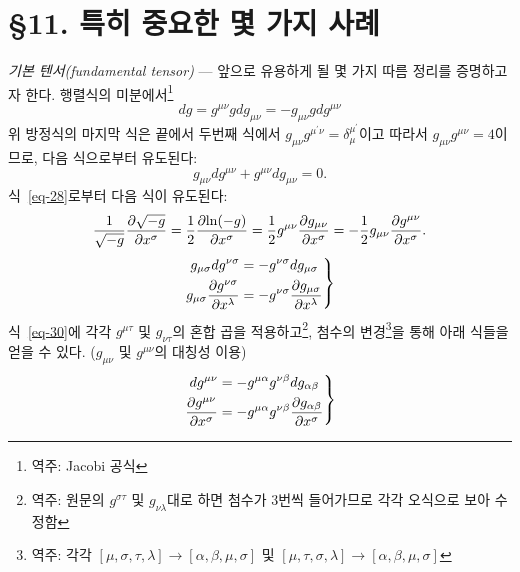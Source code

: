 \documentclass[b5paper]{article}
\begin{document}
\section*{\S 11. 특히 중요한 몇 가지 사례}
\emph{기본 텐서(fundamental tensor)} --- 앞으로 유용하게 될 몇 가지 따름 정리를 증명하고자 한다. 행렬식의 미분에서\footnote{역주: Jacobi 공식}
\begin{equation} \label{eq-28}
	dg = g^{\mu\nu} g dg_{\mu\nu} = -g_{\mu\nu} g dg^{\mu\nu}
\end{equation}
위 방정식의 마지막 식은 끝에서 두번째 식에서 $g_{\mu\nu} g^{\mu^\prime \nu} = \delta_\mu^{\mu^\prime}$이고 따라서 $g_{\mu\nu} g^{\mu\nu} = 4$이므로, 다음 식으로부터 유도된다:
\begin{equation*}
	g_{\mu\nu} dg^{\mu\nu} + g^{\mu\nu} dg_{\mu\nu} = 0.
\end{equation*}
식~\eqref{eq-28}로부터 다음 식이 유도된다:
\begin{equation} \label{eq-29}
	\dfrac{1}{\sqrt{-g}}{\frac{{\partial}{\sqrt{-g}}}{{\partial}{x^\sigma}}}
	= \dfrac{1}{2} {\frac{{\partial}{\ln(-g)}}{{\partial}{x^\sigma}}}
	= \dfrac{1}{2} g^{\mu\nu} {\frac{{\partial}{g_{\mu\nu}}}{{\partial}{x^\sigma}}}
	= -\dfrac{1}{2} g_{\mu\nu} {\frac{{\partial}{g^{\mu\nu}}}{{\partial}{x^\sigma}}}.
\end{equation}
\begin{equation} \label{eq-30}
	\left.
	\begin{aligned}
	   g_{\mu\sigma} dg^{\nu\sigma}&=-g^{\nu\sigma} dg_{\mu\sigma} \\
	   g_{\mu\sigma} {\frac{{\partial}{g^{\nu\sigma}}}{{\partial}{x^\lambda}}}
	   &= -g^{\nu\sigma} {\frac{{\partial}{g_{\mu\sigma}}}{{\partial}{x^\lambda}}}
	\end{aligned}
	\right\}
\end{equation}
식~\eqref{eq-30}에 각각 $g^{\mu\tau}$ 및 $g_{\nu\tau}$의 혼합 곱을 적용하고\footnote{역주: 원문의 $g^{\sigma\tau}$ 및 $g_{\nu\lambda}$대로 하면 첨수가 3번씩 들어가므로 각각 오식으로 보아 수정함}, 첨수의 변경\footnote{역주: 각각 $ \left[\mu, \sigma, \tau, \lambda\right]\rightarrow \left[\alpha, \beta, \mu, \sigma\right] $ 및 $ \left[\mu, \tau, \sigma, \lambda\right]\rightarrow \left[\alpha, \beta, \mu, \sigma\right] $}을 통해 아래 식들을 얻을 수 있다. ($g_{\mu\nu}$ 및 $g^{\mu\nu}$의 대칭성 이용)
\begin{equation} \label{eq-31}
\left.
\begin{aligned}
dg^{\mu\nu}&=- g^{\mu\alpha} g^{\nu\beta}dg_{\alpha\beta} \\
{\frac{{\partial}{g^{\mu\nu}}}{{\partial}{x^\sigma}}}
&= - g^{\mu\alpha} g^{\nu\beta} {\frac{{\partial}{g_{\alpha\beta}}}{{\partial}{x^\sigma}}} 
\end{aligned}
\right\}
\end{equation}
\end{document}
